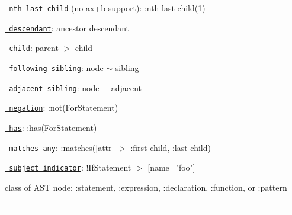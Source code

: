 \begin{DoxyItemize}
\item \href{http://dev.w3.org/csswg/selectors4/\#the-nth-last-child-pseudo}{\texttt{ nth-\/last-\/child}} (no ax+b support)\+: {\ttfamily \+:nth-\/last-\/child(1)}
\item \href{http://dev.w3.org/csswg/selectors4/\#descendant-combinators}{\texttt{ descendant}}\+: {\ttfamily ancestor descendant}
\item \href{http://dev.w3.org/csswg/selectors4/\#child-combinators}{\texttt{ child}}\+: {\ttfamily parent \texorpdfstring{$>$}{>} child}
\item \href{http://dev.w3.org/csswg/selectors4/\#general-sibling-combinators}{\texttt{ following sibling}}\+: {\ttfamily node \texorpdfstring{$\sim$}{\string~} sibling}
\item \href{http://dev.w3.org/csswg/selectors4/\#adjacent-sibling-combinators}{\texttt{ adjacent sibling}}\+: {\ttfamily node + adjacent}
\item \href{http://dev.w3.org/csswg/selectors4/\#negation-pseudo}{\texttt{ negation}}\+: {\ttfamily \+:not(\+For\+Statement)}
\item \href{https://drafts.csswg.org/selectors-4/\#has-pseudo}{\texttt{ has}}\+: {\ttfamily \+:has(\+For\+Statement)}
\item \href{http://dev.w3.org/csswg/selectors4/\#matches}{\texttt{ matches-\/any}}\+: {\ttfamily \+:matches(\mbox{[}attr\mbox{]} \texorpdfstring{$>$}{>} \+:first-\/child, \+:last-\/child)}
\item \href{http://dev.w3.org/csswg/selectors4/\#subject}{\texttt{ subject indicator}}\+: {\ttfamily !\+If\+Statement \texorpdfstring{$>$}{>} \mbox{[}name="{}foo"{}\mbox{]}}
\item class of AST node\+: {\ttfamily \+:statement}, {\ttfamily \+:expression}, {\ttfamily \+:declaration}, {\ttfamily \+:function}, or {\ttfamily \+:pattern}
\end{DoxyItemize}

\href{https://travis-ci.org/estools/esquery}{\texttt{ }} 